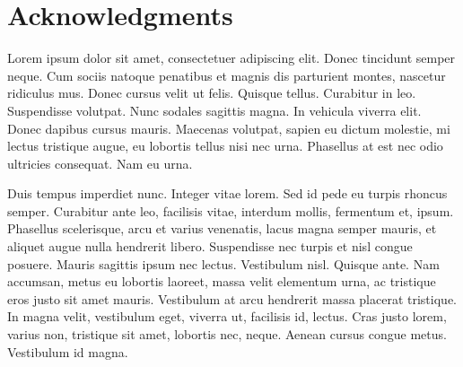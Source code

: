 \section*{Acknowledgments}

Lorem ipsum dolor sit amet, consectetuer adipiscing elit. Donec
tincidunt semper neque. Cum sociis natoque penatibus et magnis dis
parturient montes, nascetur ridiculus mus. Donec cursus velit ut
felis. Quisque tellus. Curabitur in leo. Suspendisse volutpat. Nunc
sodales sagittis magna. In vehicula viverra elit. Donec dapibus cursus
mauris. Maecenas volutpat, sapien eu dictum molestie, mi lectus
tristique augue, eu lobortis tellus nisi nec urna. Phasellus at est
nec odio ultricies consequat. Nam eu urna.

Duis tempus imperdiet nunc. Integer vitae lorem. Sed id pede eu turpis
rhoncus semper. Curabitur ante leo, facilisis vitae, interdum mollis,
fermentum et, ipsum. Phasellus scelerisque, arcu et varius venenatis,
lacus magna semper mauris, et aliquet augue nulla hendrerit
libero. Suspendisse nec turpis et nisl congue posuere. Mauris sagittis
ipsum nec lectus. Vestibulum nisl. Quisque ante. Nam accumsan, metus
eu lobortis laoreet, massa velit elementum urna, ac tristique eros
justo sit amet mauris. Vestibulum at arcu hendrerit massa placerat
tristique. In magna velit, vestibulum eget, viverra ut, facilisis id,
lectus. Cras justo lorem, varius non, tristique sit amet, lobortis
nec, neque. Aenean cursus congue metus. Vestibulum id magna.  

